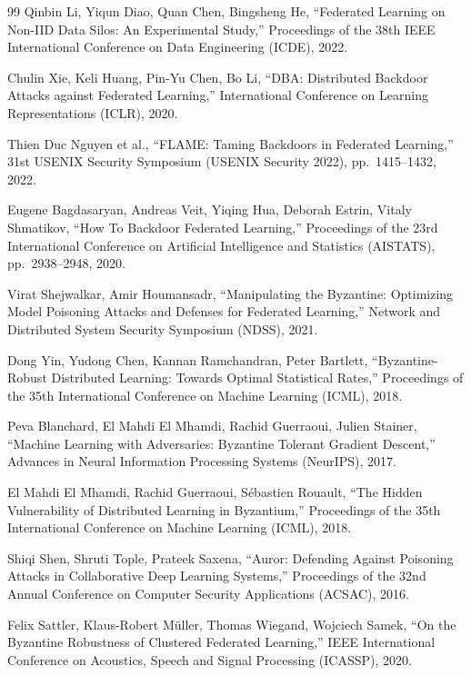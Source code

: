 \documentclass[a4j, twocolumn, dvipdfmx]{jsarticle}
\begin{document}
\begin{thebibliography}{99}
Qinbin Li, Yiqun Diao, Quan Chen, Bingsheng He,
``Federated Learning on Non-IID Data Silos: An Experimental Study,''
Proceedings of the 38th IEEE International Conference on Data Engineering (ICDE), 2022.

Chulin Xie, Keli Huang, Pin-Yu Chen, Bo Li,
``DBA: Distributed Backdoor Attacks against Federated Learning,''
International Conference on Learning Representations (ICLR), 2020.

Thien Duc Nguyen et al.,
``FLAME: Taming Backdoors in Federated Learning,''
31st USENIX Security Symposium (USENIX Security 2022), pp.~1415--1432, 2022.

Eugene Bagdasaryan, Andreas Veit, Yiqing Hua, Deborah Estrin, Vitaly Shmatikov,
``How To Backdoor Federated Learning,''
Proceedings of the 23rd International Conference on Artificial Intelligence and Statistics (AISTATS),
pp.~2938--2948, 2020.

Virat Shejwalkar, Amir Houmansadr,
``Manipulating the Byzantine: Optimizing Model Poisoning Attacks and Defenses for Federated Learning,''
Network and Distributed System Security Symposium (NDSS), 2021.

Dong Yin, Yudong Chen, Kannan Ramchandran, Peter Bartlett,
``Byzantine-Robust Distributed Learning: Towards Optimal Statistical Rates,''
Proceedings of the 35th International Conference on Machine Learning (ICML), 2018.

Peva Blanchard, El Mahdi El Mhamdi, Rachid Guerraoui, Julien Stainer,
``Machine Learning with Adversaries: Byzantine Tolerant Gradient Descent,''
Advances in Neural Information Processing Systems (NeurIPS), 2017.

El Mahdi El Mhamdi, Rachid Guerraoui, S\'ebastien Rouault,
``The Hidden Vulnerability of Distributed Learning in Byzantium,''
Proceedings of the 35th International Conference on Machine Learning (ICML), 2018.

Shiqi Shen, Shruti Tople, Prateek Saxena,
``Auror: Defending Against Poisoning Attacks in Collaborative Deep Learning Systems,''
Proceedings of the 32nd Annual Conference on Computer Security Applications (ACSAC), 2016.

Felix Sattler, Klaus-Robert M\"uller, Thomas Wiegand, Wojciech Samek,
``On the Byzantine Robustness of Clustered Federated Learning,''
IEEE International Conference on Acoustics, Speech and Signal Processing (ICASSP), 2020.


\end{thebibliography}
\end{document}
